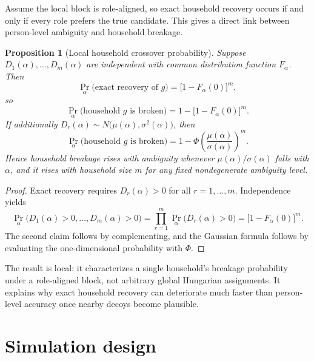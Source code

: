 \documentclass[11pt]{article}
\newtheorem{proposition}{Proposition}[section]
\theoremstyle{remark}
\begin{document}
Assume the local block is role-aligned, so exact household recovery occurs if and only if every role prefers the true candidate. This gives a direct link between person-level ambiguity and household breakage.

\begin{proposition}[Local household crossover probability]
\label{prop:crossover-household}
Suppose $D_1(\alpha),\dots,D_m(\alpha)$ are independent with common distribution function $F_\alpha$. Then
\begin{equation}
\Pr_\alpha\bigl(\text{exact recovery of }g\bigr)=\bigl[1-F_\alpha(0)\bigr]^m,
\label{eq:exact-recovery-household}
\end{equation}
so
\begin{equation}
\Pr_\alpha\bigl(\text{household }g\text{ is broken}\bigr)=1-\bigl[1-F_\alpha(0)\bigr]^m.
\label{eq:crossover-prob-household}
\end{equation}
If additionally $D_r(\alpha)\sim N\!\bigl(\mu(\alpha),\sigma^2(\alpha)\bigr)$, then
\begin{equation}
\Pr_\alpha\bigl(\text{household }g\text{ is broken}\bigr)
=
1-\Phi\!\left(\frac{\mu(\alpha)}{\sigma(\alpha)}\right)^m.
\label{eq:gaussian-crossover-household}
\end{equation}
Hence household breakage rises with ambiguity whenever $\mu(\alpha)/\sigma(\alpha)$ falls with $\alpha$, and it rises with household size $m$ for any fixed nondegenerate ambiguity level.
\end{proposition}

\begin{proof}
Exact recovery requires $D_r(\alpha)>0$ for all $r=1,\dots,m$. Independence yields
\[
\Pr_\alpha\bigl(D_1(\alpha)>0,\dots,D_m(\alpha)>0\bigr)
=
\prod_{r=1}^m \Pr_\alpha\bigl(D_r(\alpha)>0\bigr)
=
\bigl[1-F_\alpha(0)\bigr]^m.
\]
The second claim follows by complementing, and the Gaussian formula follows by evaluating the one-dimensional probability with $\Phi$.
\end{proof}

The result is local: it characterizes a single household's breakage probability under a role-aligned block, not arbitrary global Hungarian assignments. It explains why exact household recovery can deteriorate much faster than person-level accuracy once nearby decoys become plausible.

\section{Simulation design}
\label{sec:simulation}
\end{document}
